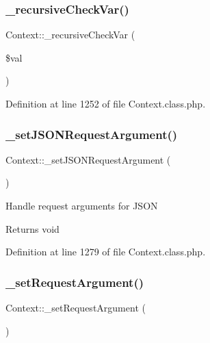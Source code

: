 \subsubsection{\texorpdfstring{\+\_\+recursive\+Check\+Var()}{\_recursiveCheckVar()}}
{\footnotesize\ttfamily Context\+::\+\_\+recursive\+Check\+Var (\begin{DoxyParamCaption}\item[{}]{\$val }\end{DoxyParamCaption})}



Definition at line 1252 of file Context.\+class.\+php.

\mbox{\label{classContext_ae07924273ca1b17fe67a7cf978d762fc}} 
\subsubsection{\texorpdfstring{\+\_\+set\+J\+S\+O\+N\+Request\+Argument()}{\_setJSONRequestArgument()}}
{\footnotesize\ttfamily Context\+::\+\_\+set\+J\+S\+O\+N\+Request\+Argument (\begin{DoxyParamCaption}{ }\end{DoxyParamCaption})}

Handle request arguments for J\+S\+ON

\begin{DoxyReturn}{Returns}
void 
\end{DoxyReturn}


Definition at line 1279 of file Context.\+class.\+php.

\mbox{\label{classContext_acfc274753d9687732458bfaba540c120}} 
\subsubsection{\texorpdfstring{\+\_\+set\+Request\+Argument()}{\_setRequestArgument()}}
{\footnotesize\ttfamily Context\+::\+\_\+set\+Request\+Argument (\begin{DoxyParamCaption}{ }\end{DoxyParamCaption})}

